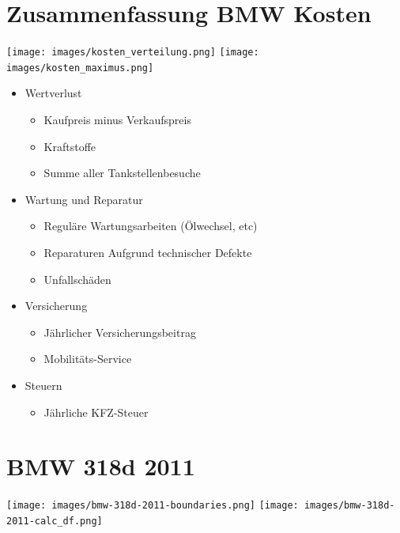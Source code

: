 \documentclass[landscape, DIV=99, 14pt]{scrartcl}
\begin{document}
\twocolumn
\section*{Zusammenfassung BMW Kosten}
\texttt{[image: images/kosten\_verteilung.png]}
\texttt{[image: images/kosten\_maximus.png]}

\pagebreak

\begin{itemize}
    \item Wertverlust
    \begin{itemize}
        \item Kaufpreis minus Verkaufspreis
        \item Kraftstoffe
        \item Summe aller Tankstellenbesuche
    \end{itemize}
    \item Wartung und Reparatur
    \begin{itemize}
        \item Regul\"are Wartungsarbeiten (\"Olwechsel, etc)
        \item Reparaturen Aufgrund technischer Defekte
        \item Unfallsch\"aden
    \end{itemize}
    \item Versicherung
    \begin{itemize}
        \item J\"ahrlicher Versicherungsbeitrag
        \item Mobilit\"ats-Service
    \end{itemize}
    \item Steuern
    \begin{itemize}
            \item J\"ahrliche KFZ-Steuer
    \end{itemize}
\end{itemize}


\twocolumn

\section*{BMW 318d 2011}
\begin{center}
\texttt{[image: images/bmw-318d-2011-boundaries.png]}
\null
\vspace{0.5cm}
\texttt{[image: images/bmw-318d-2011-calc\_df.png]}
\end{center}
\end{document}
